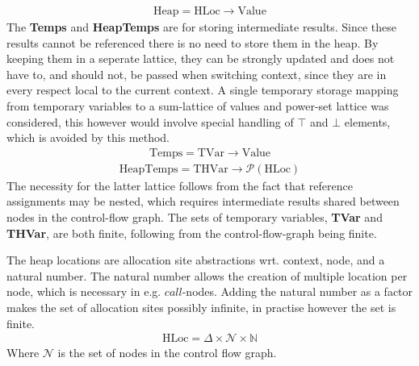 \begin{align}
\text{Heap} = \text{HLoc} \rightarrow \text{Value}
\end{align}
The {\bf Temps} and {\bf HeapTemps} are for storing intermediate results. Since these results cannot be referenced there is no need to store them in the heap. By keeping them in a seperate lattice, they can be strongly updated and does not have to, and should not, be passed when switching context, since they are in every respect local to the current context. A single temporary storage mapping from temporary variables to a sum-lattice of values and power-set lattice was considered, this however would involve special handling of $\top$ and $\bot$ elements, which is avoided by this method. 
\begin{align}
\text{Temps} = \text{TVar} \rightarrow \text{Value}
\end{align}
\begin{align}
\text{HeapTemps} = \text{THVar} \rightarrow \mathcal{P}(\text{HLoc})
\end{align}
The necessity for the latter lattice follows from the fact that reference assignments may be nested, which requires intermediate results shared between nodes in the control-flow graph. The sets of temporary variables, {\bf TVar} and {\bf THVar}, are both finite, following from the control-flow-graph being finite.

The heap locations are allocation site abstractions wrt. context, node, and a natural number. The natural number allows the creation of multiple location per node, which is necessary in e.g. $\mathit{call}$-nodes. Adding the natural number as a factor makes the set of allocation sites possibly infinite, in practise however the set is finite. 
\begin{align}
\text{HLoc}  = \Delta \times \mathcal{N} \times \mathbb{N}
\end{align}
Where $\mathcal{N}$ is the set of nodes in the control flow graph. 

